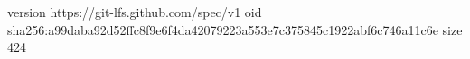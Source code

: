 version https://git-lfs.github.com/spec/v1
oid sha256:a99daba92d52ffc8f9e6f4da42079223a553e7c375845c1922abf6c746a11c6e
size 424
